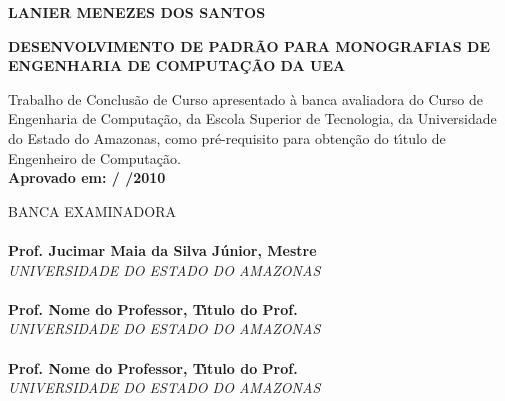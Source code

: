 \documentclass{dcctese}
\begin{document}
\newpage


\begin{center}
\bf LANIER MENEZES DOS SANTOS\\[1.5 cm]
\end{center}

\begin{center}
\bf DESENVOLVIMENTO DE PADR\~{A}O PARA MONOGRAFIAS DE ENGENHARIA DE COMPUTA\c{C}\~{A}O DA UEA\\[1.5cm]
\end{center}

\hspace*{8cm}
\begin{minipage}{8cm} 

Trabalho de Conclus\~{a}o de Curso apresentado \`{a} 
banca avaliadora do Curso de Engenharia de Computa\c{c}\~{a}o, 
da Escola Superior de Tecnologia, da Universidade do Estado do Amazonas, 
como pr\'e-requisito para obten\c{c}\~{a}o do t\'{\i}tulo de 
Engenheiro de Computa\c{c}\~{a}o.\\

\large \bf Aprovado em:  /  /2010
\end{minipage} 

BANCA EXAMINADORA\\[12 pt]

\noindent \hrulefill \hspace*{6cm} \\
\noindent \textbf{Prof. Jucimar Maia da Silva J\'{u}nior, Mestre}\\
\textit{UNIVERSIDADE DO ESTADO DO AMAZONAS}\\[0.5cm]

\noindent \hrulefill \hspace*{6cm} \\
\noindent \textbf{Prof. Nome do Professor, T\'{\i}tulo do Prof.}\\
\textit{UNIVERSIDADE DO ESTADO DO AMAZONAS}\\[0.5cm]

\noindent \hrulefill \hspace*{6cm} \\
\noindent \textbf{Prof. Nome do Professor, T\'{\i}tulo do Prof.}\\
\textit{UNIVERSIDADE DO ESTADO DO AMAZONAS}\\
\end{document}
